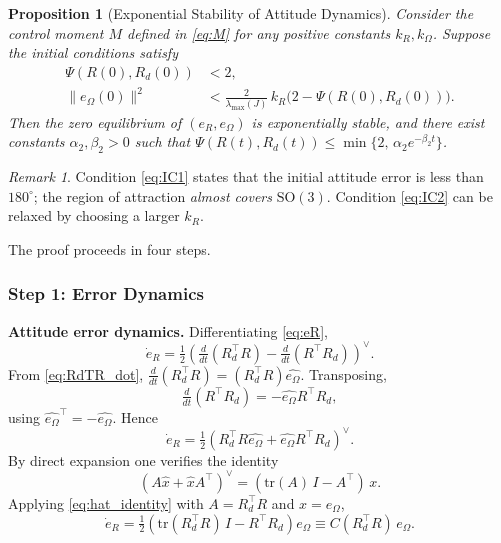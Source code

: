 \documentclass[11pt]{article}
\newtheorem{proposition}{Proposition}
\theoremstyle{remark}
\newtheorem{remark}{Remark}
\newcommand{\SO}{\mathrm{SO}(3)}
\newcommand{\tr}{\mathrm{tr}}
\newcommand{\hatmap}[1]{\widehat{#1}}
\newcommand{\lmax}{\lambda_{\max}}
\begin{document}
\begin{proposition}[Exponential Stability of Attitude Dynamics]
\label{prop:1}
Consider the control moment $M$ defined in \eqref{eq:M} for any positive constants $k_R, k_\Omega$. Suppose the initial conditions satisfy
\begin{align}
    \Psi(R(0), R_d(0)) &< 2, \label{eq:IC1}\\
    \|e_\Omega(0)\|^2 &< \tfrac{2}{\lmax(J)}\, k_R\bigl(2 - \Psi(R(0), R_d(0))\bigr). \label{eq:IC2}
\end{align}
Then the zero equilibrium of $(e_R, e_\Omega)$ is exponentially stable, and there exist constants $\alpha_2, \beta_2 > 0$ such that
$\Psi(R(t), R_d(t)) \leq \min\{2,\, \alpha_2 e^{-\beta_2 t}\}$.
\end{proposition}

\begin{remark}
Condition \eqref{eq:IC1} states that the initial attitude error is less than $180^\circ$; the region of attraction \emph{almost covers} $\SO$. Condition \eqref{eq:IC2} can be relaxed by choosing a larger $k_R$.
\end{remark}

The proof proceeds in four steps.

\subsubsection*{Step 1: Error Dynamics}

\textbf{Attitude error dynamics.} Differentiating \eqref{eq:eR},
\[
\dot{e}_R = \tfrac{1}{2}\left(\tfrac{d}{dt}(R_d^\top R) - \tfrac{d}{dt}(R^\top R_d)\right)^\vee.
\]
From \eqref{eq:RdTR_dot}, $\tfrac{d}{dt}(R_d^\top R) = (R_d^\top R)\hatmap{e_\Omega}$. Transposing,
\[
\tfrac{d}{dt}(R^\top R_d) = -\hatmap{e_\Omega} R^\top R_d,
\]
using $\hatmap{e_\Omega}^\top = -\hatmap{e_\Omega}$. Hence
\[
\dot{e}_R = \tfrac{1}{2}\left(R_d^\top R\hatmap{e_\Omega} + \hatmap{e_\Omega} R^\top R_d\right)^\vee.
\]
By direct expansion one verifies the identity
\begin{equation}
(A\hatmap{x} + \hatmap{x}A^\top)^\vee = (\tr(A)\,I - A^\top)\,x.
\label{eq:hat_identity}
\end{equation}
Applying \eqref{eq:hat_identity} with $A = R_d^\top R$ and $x = e_\Omega$,
\begin{equation}
\dot{e}_R = \tfrac{1}{2}\left(\tr(R_d^\top R)\,I - R^\top R_d\right)e_\Omega \equiv C(R_d^\top R)\,e_\Omega.
\label{eq:eRdot}
\end{equation}
\end{document}
